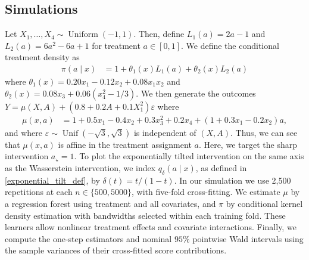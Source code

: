 \documentclass[11pt,twoside]{article}
\theoremstyle{definition}
\theoremstyle{remark}
\begin{document}
\subsection{Simulations} \label{simulation_subsection}

Let $X_1,\ldots,X_4 \sim \operatorname{Uniform}(-1,1)$. Then, define $L_1(a)=2a-1$ and $L_2(a)=6a^2-6a+1$ for treatment $a \in [0, 1]$. We define the conditional treatment density as 
\begin{align*}
    \pi(a\mid x)&=1+\theta_1(x)L_1(a)+\theta_2(x)L_2(a)
\end{align*}
where $\theta_1(x)=0.20x_1-0.12x_2+0.08x_1x_2$ and $\theta_2(x)=0.08x_3+0.06(x_4^2-1/3)$. We then generate the outcomes $Y=\mu(X,A)+(0.8+0.2A+0.1X_1^2)\varepsilon$ where
\begin{align*}
    \mu(x,a)&=1+0.5x_1-0.4x_2+0.3x_3^2+0.2x_4
        +(1+0.3x_1-0.2x_2)a,
\end{align*}
and where $\varepsilon\sim\operatorname{Unif}(-\sqrt{3},\sqrt{3})$ is independent of $(X,A)$. Thus, we can see that $\mu(x, a)$ is affine in the treatment assignment $a$. Here, we target the sharp intervention $a_\star=1$. To plot the exponentially tilted intervention on the same axis as the Wasserstein intervention, we index $q_\delta(a \mid x)$, as defined in \cref{exponential_tilt_def}, by $\delta(t)=t/(1-t)$. In our simulation we use 2,500 repetitions at each $n\in\{500, 5000\}$, with five-fold cross-fitting. We estimate $\mu$ by a regression forest using treatment and all covariates, and $\pi$ by conditional kernel density estimation with bandwidths selected within each training fold. These learners allow nonlinear treatment effects and covariate interactions. Finally, we compute the one-step estimators and nominal $95\%$ pointwise Wald intervals using the sample variances of their cross-fitted score contributions.
\end{document}

